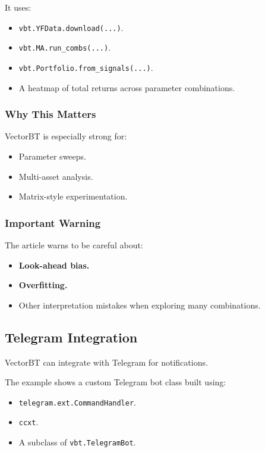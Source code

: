 \documentclass[12pt,openany]{book}
\begin{document}
It uses:

\begin{itemize}[leftmargin=*]
    \item \texttt{vbt.YFData.download(...)}.
    \item \texttt{vbt.MA.run\_combs(...)}.
    \item \texttt{vbt.Portfolio.from\_signals(...)}.
    \item A heatmap of total returns across parameter combinations.
\end{itemize}

\subsubsection{Why This Matters}

VectorBT is especially strong for:

\begin{itemize}[leftmargin=*]
    \item Parameter sweeps.
    \item Multi-asset analysis.
    \item Matrix-style experimentation.
\end{itemize}

\subsubsection{Important Warning}

The article warns to be careful about:

\begin{itemize}[leftmargin=*]
    \item \textbf{Look-ahead bias.}
    \item \textbf{Overfitting.}
    \item Other interpretation mistakes when exploring many combinations.
\end{itemize}

\subsection{Telegram Integration}

VectorBT can integrate with Telegram for notifications.

The example shows a custom Telegram bot class built using:

\begin{itemize}[leftmargin=*]
    \item \texttt{telegram.ext.CommandHandler}.
    \item \texttt{ccxt}.
    \item A subclass of \texttt{vbt.TelegramBot}.
\end{itemize}
\end{document}
